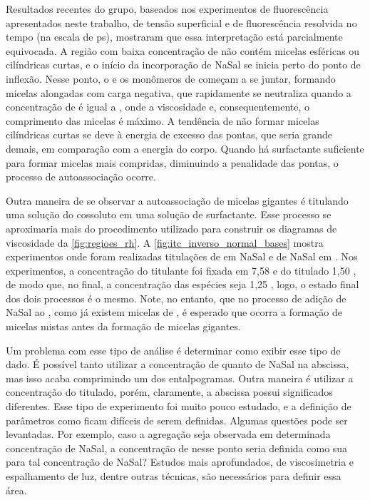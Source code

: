 		Resultados recentes do grupo, baseados nos experimentos de fluorescência apresentados neste trabalho, de tensão superficial e de fluorescência resolvida no tempo (na escala de ps), mostraram que essa interpretação está parcialmente equivocada. A região com baixa concentração de \TTAB{} não contém micelas esféricas ou cilíndricas curtas, e o início da incorporação de NaSal se inicia perto do ponto de inflexão. Nesse ponto, o \Sal{} e os monômeros de \TTAB{} começam a se juntar, formando micelas alongadas com carga negativa, que rapidamente se neutraliza quando a concentração de \TTAB{} é igual a \cwlm, onde a viscosidade e, consequentemente, o comprimento das micelas é máximo. A tendência de não formar micelas cilíndricas curtas se deve à energia de excesso das pontas, que seria grande demais, em comparação com a energia do corpo. Quando há surfactante suficiente para formar micelas mais compridas, diminuindo a penalidade das pontas, o processo de autoassociação ocorre. %
		
		Outra maneira de se observar a autoassociação de micelas gigantes é titulando uma solução do cossoluto em uma solução de surfactante. Esse processo se aproximaria mais do procedimento utilizado para construir os diagramas de viscosidade da \autoref{fig:regioes_rh}.	A \autoref{fig:itc_inverso_normal_bases} mostra experimentos onde foram realizadas titulações de \TTAB{} em NaSal e de NaSal em \TTAB{}. Nos experimentos, a concentração do titulante foi fixada em 7,58 \mM{} e do titulado 1,50 \mM{}, de modo que, no final, a concentração das espécies seja 1,25 \mM{}, logo, o estado final dos dois processos é o mesmo. Note, no entanto, que no processo de adição de NaSal ao \TTAB, como já existem micelas de \TTAB, é esperado que ocorra a formação de micelas mistas antes da formação de micelas gigantes.
		
		Um problema com esse tipo de análise é determinar como exibir esse tipo de dado. É possível tanto utilizar a concentração de \TTAB{} quanto de NaSal na abscissa, mas isso acaba comprimindo um dos entalpogramas. Outra maneira é utilizar a concentração do titulado, porém, claramente, a abscissa possui significados diferentes. Esse tipo de experimento foi muito pouco estudado, e a definição de parâmetros como \cwlm{} ficam difíceis de serem definidas. Algumas questões pode ser levantadas. Por exemplo, caso a agregação seja observada em determinada concentração de NaSal, a concentração de \TTAB{} nesse ponto seria definida como sua \cwlm{} para tal concentração de NaSal? Estudos mais aprofundados, de viscosimetria e espalhamento de luz, dentre outras técnicas, são necessários para definir essa área.
		
